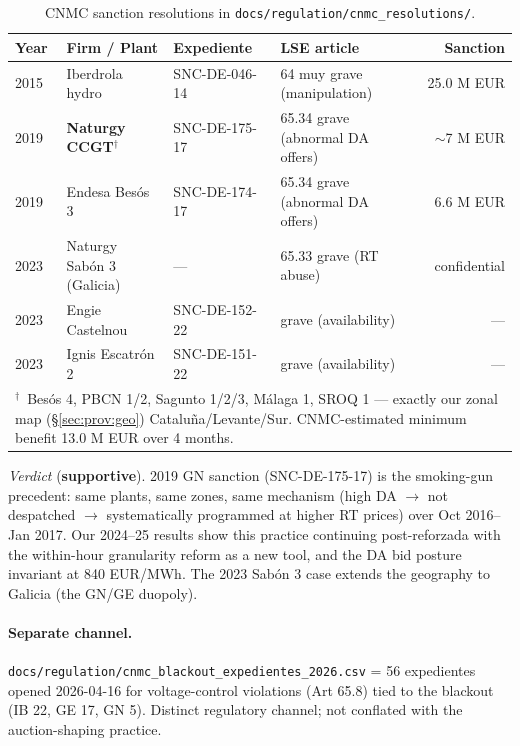 \documentclass[11pt,a4paper]{article}
\newcommand{\code}[1]{\nolinkurl{#1}}
\begin{document}
\begin{table}[H]
\centering
\caption{CNMC sanction resolutions in \code{docs/regulation/cnmc_resolutions/}.}
\label{tab:cnmc_sanctions}
\begin{tabular}{l l l l r}
\toprule
Year & Firm / Plant & Expediente & LSE article & Sanction \\
\midrule
2015 & Iberdrola hydro             & SNC-DE-046-14 & 64 muy grave (manipulation)   & 25.0 M EUR \\
2019 & \textbf{Naturgy CCGT$^\dagger$} & SNC-DE-175-17 & 65.34 grave (abnormal DA offers) & $\sim$7 M EUR \\
2019 & Endesa Besós 3              & SNC-DE-174-17 & 65.34 grave (abnormal DA offers) & 6.6 M EUR \\
2023 & Naturgy Sabón 3 (Galicia)   & ---           & 65.33 grave (RT abuse)        & confidential \\
2023 & Engie Castelnou             & SNC-DE-152-22 & grave (availability)          & --- \\
2023 & Ignis Escatrón 2            & SNC-DE-151-22 & grave (availability)          & --- \\
\bottomrule
\multicolumn{5}{l}{\footnotesize{$^\dagger$~Besós 4, PBCN 1/2, Sagunto 1/2/3, Málaga 1, SROQ 1 --- exactly our zonal map (\S\ref{sec:prov:geo}) Cataluña/Levante/Sur. CNMC-estimated minimum benefit 13.0 M EUR over 4 months.}} \\
\end{tabular}
\end{table}

\textit{Verdict} (\textbf{supportive}). 2019 GN sanction (SNC-DE-175-17) is the smoking-gun precedent: same plants, same zones, same mechanism (high DA $\to$ not despatched $\to$ systematically programmed at higher RT prices) over Oct 2016--Jan 2017. Our 2024--25 results show this practice continuing post-reforzada with the within-hour granularity reform as a new tool, and the DA bid posture invariant at 840 EUR/MWh. The 2023 Sabón 3 case extends the geography to Galicia (the GN/GE duopoly).

\paragraph{Separate channel.} \code{docs/regulation/cnmc_blackout_expedientes_2026.csv} = 56 expedientes opened 2026-04-16 for voltage-control violations (Art 65.8) tied to the blackout (IB 22, GE 17, GN 5). Distinct regulatory channel; not conflated with the auction-shaping practice.
\end{document}
